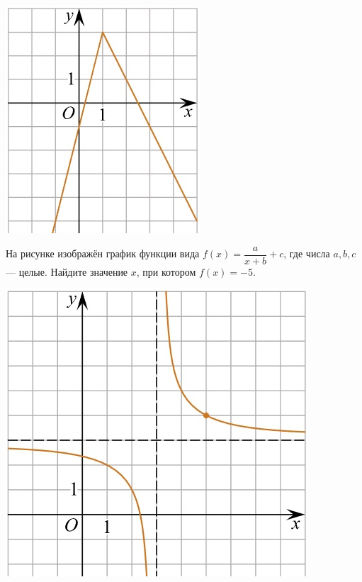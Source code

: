 \begin{class}[number=6]
\begin{listofex}
\begin{minipage}[c]{0.27\textwidth}
			\includegraphics[align=t, width=\textwidth]{pics/G101M4C6-8.jpg}
		\end{minipage}
		\item
		\begin{minipage}[t]{0.67\textwidth}
			На рисунке изображён график функции вида \(f(x)=\dfrac{a}{x+b}+c\), где числа \(a, b, c\) --- целые. Найдите значение \(x\), при котором \(f(x)=-5\).
		\end{minipage}
		\begin{minipage}[c]{0.25\textwidth}
			\includegraphics[align=t, width=\textwidth]{pics/G101M4C6-2.jpg}

\end{minipage}
\end{listofex}
\end{class}
